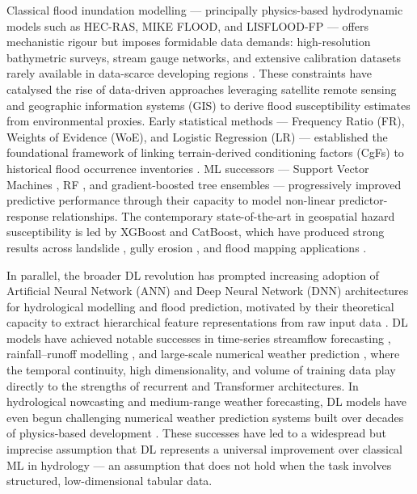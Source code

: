 \documentclass[12pt, a4paper]{article}
\begin{document}
Classical flood inundation modelling --- principally physics-based hydrodynamic models such as HEC-RAS, MIKE FLOOD, and LISFLOOD-FP --- offers mechanistic rigour but imposes formidable data demands: high-resolution bathymetric surveys, stream gauge networks, and extensive calibration datasets rarely available in data-scarce developing regions \citep{teng2017, neal2021, Bates2010}. These constraints have catalysed the rise of data-driven approaches leveraging satellite remote sensing and geographic information systems (GIS) to derive flood susceptibility estimates from environmental proxies. Early statistical methods --- Frequency Ratio (FR), Weights of Evidence (WoE), and Logistic Regression (LR) --- established the foundational framework of linking terrain-derived conditioning factors (CgFs) to historical flood occurrence inventories \citep{nampak2014, rahmati2016, Chapi2017}. ML successors --- Support Vector Machines \citep{hong2018}, RF \citep{tehrany2014, Pandey2021FrontEarth, Arora2021ANFIS}, and gradient-boosted tree ensembles \citep{chen2016, prokhorenkova2018} --- progressively improved predictive performance through their capacity to model non-linear predictor-response relationships. The contemporary state-of-the-art in geospatial hazard susceptibility is led by XGBoost and CatBoost, which have produced strong results across landslide \citep{Arabameri2021, Iban2022}, gully erosion \citep{zhang2022}, and flood mapping applications \citep{wang2020, li2021, Nguyen2022, Costache2022, Pourghasemi2020, Arora2025SciRep, Arora2022SERRA, Arora2024Argens}.

In parallel, the broader DL revolution has prompted increasing adoption of Artificial Neural Network (ANN) and Deep Neural Network (DNN) architectures for hydrological modelling and flood prediction, motivated by their theoretical capacity to extract hierarchical feature representations from raw input data \citep{sit2020, Hu2019, Mosavi2018, Ahmadlou2020JFRM}. DL models have achieved notable successes in time-series streamflow forecasting \citep{Kratzert2018, Shen2018}, rainfall--runoff modelling \citep{Frame2022}, and large-scale numerical weather prediction \citep{Bi2023, Lam2023, Rasp2021}, where the temporal continuity, high dimensionality, and volume of training data play directly to the strengths of recurrent and Transformer architectures. In hydrological nowcasting and medium-range weather forecasting, DL models have even begun challenging numerical weather prediction systems built over decades of physics-based development \citep{Bi2023, Lam2023}. These successes have led to a widespread but imprecise assumption that DL represents a universal improvement over classical ML in hydrology --- an assumption that does not hold when the task involves structured, low-dimensional tabular data.
\end{document}

